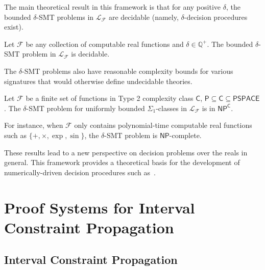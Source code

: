 \documentclass[envcountsect]{llncs}
\begin{document}
The main theoretical result in this framework is that for any positive
$\delta$, the bounded $\delta$-SMT problems in $\mathcal{L}_{\mathcal{F}}$ are
decidable (namely, $\delta$-decision
procedures exist).
\begin{theorem}[Decidability] Let $\mathcal{F}$ be any collection
of computable real functions and $\delta\in \mathbb{Q}^+$. The bounded
$\delta$-SMT
problem in $\mathcal{L}_{\mathcal{F}}$ is decidable.
\end{theorem}

The $\delta$-SMT problems also have reasonable complexity bounds for various
signatures that would otherwise define undecidable theories.
\begin{theorem}[Complexity]
Let $\mathcal{F}$ be a finite set of functions in Type 2 complexity class
$\mathsf{C}$, $\mathsf{P}\subseteq\mathsf{C}\subseteq\mathsf{PSPACE}$. The
$\delta$-SMT problem for uniformly bounded $\Sigma_1$-classes in
$\mathcal{L}_{\mathcal{F}}$ is in $\mathsf{NP^C}$.

For instance, when $\mathcal{F}$ only contains polynomial-time
computable real functions such as $\{+, \times, \exp, \sin\}$,
the $\delta$-SMT problem is $\mathsf{NP}$-complete.
\end{theorem}

These results lead to a
new perspective on decision problems over the reals in general.
This framework provides a theoretical basis for the development of
numerically-driven decision procedures such as~\cite{}.

\section{Proof Systems for Interval Constraint Propagation}\label{icp}

\subsection{Interval Constraint Propagation}
\end{document}
